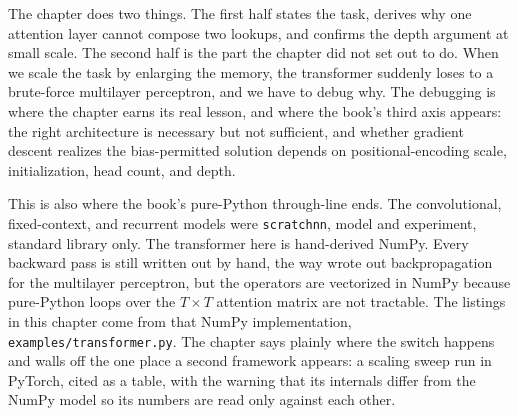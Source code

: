 The chapter does two things. The first half states the task, derives why one
attention layer cannot compose two lookups, and confirms the depth argument
at small scale. The second half is the part the chapter did not set out to
do. When we scale the task by enlarging the memory, the transformer
suddenly loses to a brute-force multilayer perceptron, and we have to debug
why. The debugging is where the chapter earns its real lesson, and where the
book's third axis appears: the right architecture is necessary but not
sufficient, and whether gradient descent realizes the bias-permitted
solution depends on positional-encoding scale, initialization, head count,
and depth.

This is also where the book's pure-Python through-line ends. The
convolutional, fixed-context, and recurrent models were
\texttt{scratchnn}, model and experiment, standard library only. The
transformer here is hand-derived NumPy. Every backward pass is still
written out by hand, the way  wrote out backpropagation
for the multilayer perceptron, but the operators are vectorized in NumPy
because pure-Python loops over the $T \times T$ attention matrix are not
tractable. The listings in this chapter come from that NumPy implementation,
\texttt{examples/transformer.py}. The chapter says plainly where the switch
happens and walls off the one place a second framework appears: a scaling
sweep run in PyTorch, cited as a table, with the warning that its internals
differ from the NumPy model so its numbers are read only against each other.







